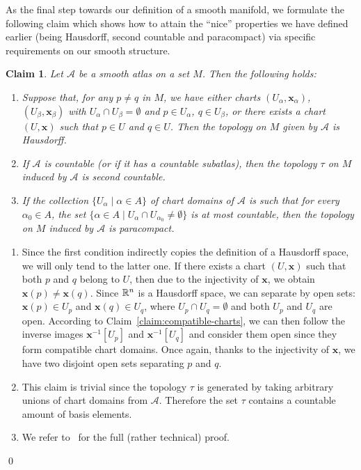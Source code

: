 \documentclass[11pt,a4paper,twoside,openany]{report}
\theoremstyle{my-theorem}
\newtheorem{claim}[theorem]{Claim}
\theoremstyle{non-theorem}
\renewenvironment{proof}[1][\proofname]{{\scshape #1. }}{\qed}
\begin{document}
		As the final step towards our definition of a smooth manifold, we formulate the following claim which shows how to attain the ``nice'' properties we have defined earlier (being Hausdorff, second countable and paracompact) via specific requirements on our smooth structure.
		\begin{claim}
			\label{claim:classification-of-hausdorff-paracompact-secound-countable}
			Let $\mathcal A$ be a smooth atlas on a set $M$. Then the following holds:
			\begin{enumerate}[label=\rm(\roman*)]
				\item Suppose that, for any $p \neq q$ in $M$, we have either charts $(U_\alpha, \mathbf x_\alpha)$, $(U_\beta, \mathbf x_\beta)$ with $U_\alpha \cap U_\beta = \emptyset$ and $p \in U_\alpha$, $q \in U_\beta$, or there exists a chart $(U,\mathbf x)$ such that $p \in U$ and $q \in U$. Then the topology on $M$ given by $\mathcal A$ is Hausdorff.
				\item If $\mathcal A$ is countable (or if it has a countable subatlas), then the topology $\tau$ on $M$ induced by $\mathcal A$ is second countable.
				\item If the collection $\{U_\alpha \mid \alpha \in A\}$ of chart domains of $\mathcal A$ is such that for every $\alpha_0 \in A$, the set $\{ \alpha \in A \mid U_\alpha \cap U_{\alpha_0} \neq \emptyset\}$ is at most countable, then the topology on $M$ induced by $\mathcal A$ is paracompact.
			\end{enumerate}
		\end{claim}
	
		\begin{proof}
			\begin{enumerate}[label=\rm(\roman*)]
				\item Since the first condition indirectly copies the definition of a Hausdorff space, we will only tend to the latter one. If there exists a chart $(U,\mathbf x)$ such that both $p$ and $q$ belong to $U$, then due to the injectivity of $\mathbf x$, we obtain $\mathbf x(p) \neq \mathbf x(q)$. Since ${\mathbb R}^n$ is a Hausdorff space, we can separate by open sets: $\mathbf x(p) \in U_p$ and $\mathbf x(q) \in U_q$, where $U_p \cap U_q = \emptyset$ and both $U_p$ and $U_q$ are open. According to Claim~\ref{claim:compatible-charts}, we can then follow the inverse images $\mathbf x^{-1}[U_p]$ and $\mathbf x^{-1}[U_q]$ and consider them open since they form compatible chart domains. Once again, thanks to the injectivity of $\mathbf x$, we have two disjoint open sets separating $p$ and $q$.
				
				\item This claim is trivial since the topology $\tau$ is generated by taking arbitrary unions of chart domains from $\mathcal A$. Therefore the set $\tau$ contains a countable amount of basis elements.
				
				\item We refer to~\cite{lee:manifolds-and-differential-geometry} for the full (rather technical) proof.
			\end{enumerate}
		\end{proof}
	
\end{document}

